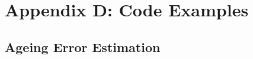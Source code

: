 \section{Appendix D: Code Examples}

\subsection{Ageing Error Estimation}
\hypertarget{AgeingError}{}


